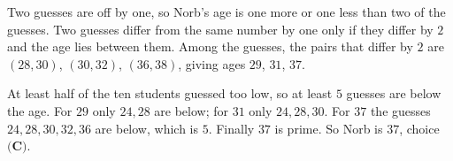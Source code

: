 Two guesses are off by one, so Norb's age is one more or one less than two of the guesses. Two guesses differ from the same number by one only if they differ by $2$ and the age lies between them. Among the guesses, the pairs that differ by $2$ are $(28,30)$, $(30,32)$, $(36,38)$, giving ages $29$, $31$, $37$.

At least half of the ten students guessed too low, so at least $5$ guesses are below the age. For $29$ only $24,28$ are below; for $31$ only $24,28,30$. For $37$ the guesses $24,28,30,32,36$ are below, which is $5$. Finally $37$ is prime. So Norb is $\boxed{37}$, choice $\textbf{(C)}$.
